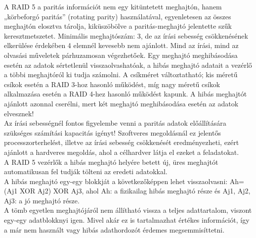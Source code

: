 \documentclass[tikz,12pt,margin=0px]{article}
\begin{document}
    {\footnotesize \noindent {\color{blue} \faLightbulbO\ $\triangleright$ } }
    {\footnotesize
    \noindent A RAID 5 a paritás információt nem egy kitüntetett meghajtón, hanem „körbeforgó paritás” (rotating parity) használatával, egyenletesen az összes meghajtón elosztva tárolja, kiküszöbölve a paritás-meghajtó jelentette szűk keresztmetszetet. Minimális meghajtószám: 3, de az írási sebesség csökkenésének elkerülése érdekében 4 elemnél kevesebb nem ajánlott. Mind az írási, mind az olvasási műveletek párhuzamosan végezhetőek. Egy meghajtó meghibásodása esetén az adatok sértetlenül visszaolvashatóak, a hibás meghajtó adatait a vezérlő a többi meghajtóról ki tudja számolni. A csíkméret változtatható; kis méretű csíkok esetén a RAID 3-hoz hasonló működést, míg nagy méretű csíkok alkalmazása esetén a RAID 4-hez hasonló működést kapunk. A hibás meghajtót ajánlott azonnal cserélni, mert két meghajtó meghibásodása esetén az adatok elvesznek!\\

    \noindent Az írási sebességnél fontos figyelembe venni a paritás adatok előállítására szükséges számítási kapacitás igényt! Szoftveres megoldásnál ez jelentős processzorterhelést, illetve az írási sebesség csökkenését eredményezheti, ezért ajánlott a hardveres megoldás, ahol a célhardver látja el ezeket a feladatokat.\\

    \noindent A RAID 5 vezérlők a hibás meghajtó helyére betett új, üres meghajtót automatikusan fel tudják tölteni az eredeti adatokkal.\\

    \noindent A hibás meghajtó egy-egy blokkját a következőképpen lehet visszaolvasni: Ah=(Aj1 XOR Aj2) XOR Aj3, ahol Ah: a fizikailag hibás meghajtó része és Aj1, Aj2, Aj3: a jó meghajtó része.\\

    \noindent A tömb egyetlen meghajtójáról nem állítható vissza a teljes adattartalom, viszont egy-egy adatblokknyi igen. Mivel akár ez is tartalmazhat értékes információt, így a már nem használt vagy hibás adathordozót érdemes megsemmisíttetni.\\\\

}
\end{document}
